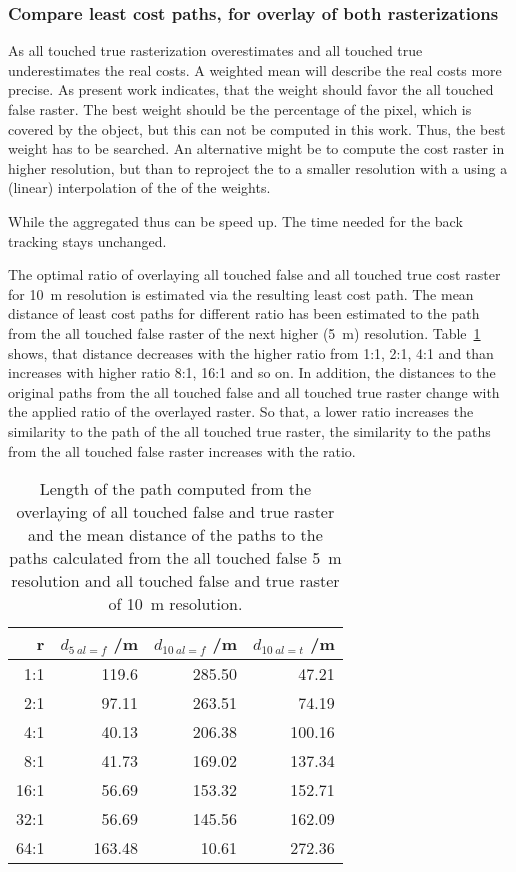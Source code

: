 \subsubsection{Compare least cost paths, for overlay of both rasterizations}

As all touched true rasterization overestimates and all touched true underestimates the real costs.
A weighted mean will describe the real costs more precise.
As present work indicates, that the weight should favor the all touched false raster.
The best weight should be the percentage of the pixel, which is covered by the object, but this can not be computed in this work.
Thus, the best weight has to be searched.
An alternative might be to compute the cost raster in higher resolution, but than to reproject the to a smaller resolution with a using a (linear) interpolation of the of the weights.

While the aggregated thus can be speed up.
The time needed for the back tracking stays unchanged.

The optimal ratio of overlaying all touched false and all touched true cost raster for 10~m resolution is estimated via the resulting least cost path. 
The mean distance of least cost paths for different ratio has been estimated to the path from the all touched false raster of the next higher (5~m) resolution. 
Table~\ref{tab:4} shows, that distance decreases with the higher ratio from 1:1, 2:1, 4:1 and than increases with higher ratio 8:1, 16:1 and so on.
In addition, the distances to the original paths from the all touched false and all touched true raster change with the applied ratio of the overlayed raster.
So that, a lower ratio increases the similarity to the path of the all touched true raster, the similarity to the paths from the all touched false raster increases with the ratio.

\begin{table}[h!]
	\caption{Length of the path computed from the overlaying of all touched false and true raster and the mean distance of the paths to the paths calculated from the all touched false 5~m resolution  and all touched false and true raster of 10~m resolution.}
	\label{tab:4}
	\centering
	\begin{tabular}{ r  r  r  r}
		r & $d_{5~al=f}$ /m &  $d_{10~al=f}$ /m & $d_{10~al=t}$ /m \\
		\hline
		
		  1:1  &    119.6 &  285.50 &  47.21\\
		  2:1  &    97.11 &  263.51 &  74.19\\
		  4:1  &    40.13 &  206.38 & 100.16\\
		  8:1  &    41.73 &  169.02 & 137.34\\
		 16:1  &    56.69 &  153.32 & 152.71\\
		 32:1  &    56.69 &  145.56 & 162.09\\
		 64:1  &   163.48 &   10.61 & 272.36\\
		
	\end{tabular}
\end{table}


